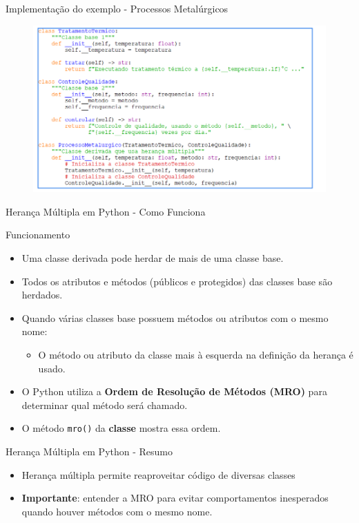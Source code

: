 \begin{frame}[fragile]{Implementação do exemplo - Processos Metalúrgicos}
\begin{figure}
    \centering
    \includegraphics[width=0.9\linewidth]{Images/tratamento-processo-qualidade.png}


\end{figure}
    
\end{frame}



\begin{frame}{Herança Múltipla em Python - Como Funciona}

\begin{block}{Funcionamento}
\begin{itemize}
    \item Uma classe derivada pode herdar de mais de uma classe base.
    \item Todos os atributos e métodos (públicos e protegidos) das classes base são herdados.
    \item Quando várias classes base possuem métodos ou atributos com o mesmo nome:
    \begin{itemize}
        \item O método ou atributo da classe mais à esquerda na definição da herança é usado.
    \end{itemize}
    \item O Python utiliza a \textbf{Ordem de Resolução de Métodos (MRO)} para determinar qual método será chamado.
    \item O método \texttt{mro()} da \textbf{classe} mostra essa ordem.
\end{itemize}
\end{block}


\end{frame}

\begin{frame}{Herança Múltipla em Python - Resumo}

\begin{itemize}
    \item Herança múltipla permite reaproveitar código de diversas classes
    \item \textbf{Importante}: entender a MRO para evitar comportamentos inesperados quando houver métodos com o mesmo nome.
\end{itemize}



\end{frame}




